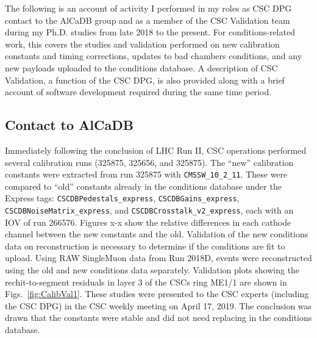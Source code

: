 
The following is an account of activity I performed in my roles as CSC DPG contact to the AlCaDB group and as a member of the CSC Validation team during my Ph.D. studies from late 2018 to the present. For conditions-related work, this covers the studies and validation performed on new calibration constants and timing corrections, updates to bad chambers conditions, and any new payloads uploaded to the conditions database. A description of CSC Validation, a function of the CSC DPG, is also provided along with a brief account of software development required during the same time period.

\subsection{Contact to AlCaDB}

Immediately following the conclusion of LHC Run II, CSC operations performed several calibration runs (325875, 325656, and 325875). The ``new'' calibration constants were extracted from run 325875 with \texttt{CMSSW\_10\_2\_11}. These were compared to ``old'' constants already in the conditions database under the Express tags: \texttt{CSCDBPedestals\_express}, \texttt{CSCDBGains\_express}, \texttt{CSCDBNoiseMatrix\_express}, and \texttt{CSCDBCrosstalk\_v2\_express}, each with an IOV of run 266576. Figures x-x show the relative differences in each cathode channel between the new constants and the old. Validation of the new conditions data on reconstruction is necessary to determine if the conditions are fit to upload. Using RAW SingleMuon data from Run 2018D, events were reconstructed using the old and new conditions data separately. Validation plots showing the rechit-to-segment residuals in layer 3 of the CSCs ring ME1/1 are shown in Figs.~\ref{fig:CalibVal1}. These studies were presented to the CSC experts (including the CSC DPG) in the CSC weekly meeting on April 17, 2019. The conclusion was drawn that the constants were stable and did not need replacing in the conditions database. 

